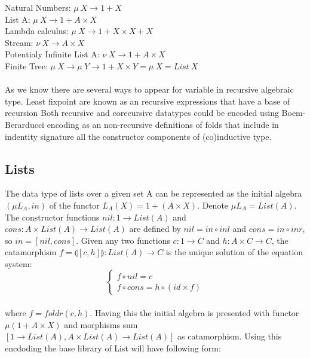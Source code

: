 \documentclass[11pt,oneside]{article}
\begin{document}
\noindent Natural Numbers: $\mu\ X \rightarrow 1 + X$\\
List A: $\mu\ X \rightarrow 1 + A \times X$\\
Lambda calculus: $\mu\ X \rightarrow 1 + X \times X + X$\\
Stream: $\nu\ X \rightarrow A \times X$\\
Potentialy Infinite List A: $\nu\ X \rightarrow 1 + A \times X$\\
Finite Tree: $\mu\ X \rightarrow \mu\ Y \rightarrow 1 + X \times Y = \mu\ X = List\ X$\\

\paragraph{}
As we know there are several ways to appear for variable in recursive algebraic type.
Least fixpoint are known as an recursive expressions that have a base of recursion
Both recursive and corecursive datatypes could be encoded using Boem-Berarducci encoding
as an non-recursive definitions of folds that include in indentity signature all the
constructor components of (co)inductive type.

\subsection{Lists}
The data type of lists over a given set A can be represented as the initial algebra
$(\mu L_A, in)$ of the functor $L_A(X) = 1 + (A \times X)$. Denote $\mu L_A = List(A)$.
The constructor functions $nil: 1 \rightarrow List(A)$ and
$cons: A \times List(A) \rightarrow List(A)$ are defined by
$nil = in \circ inl$ and $cons = in \circ inr$, so $in = [nil,cons]$.
Given any two functions $c: 1 \rightarrow C$ and $h: A \times C \rightarrow C$,
the catamorphism $f = \llparenthesis [c,h] \rrparenthesis : List(A) \rightarrow C$
is the unique solution of the equation system:
\vspace{0.3cm}
$$
\begin{cases}
  f \circ nil  = c \\
  f \circ cons = h \circ (id \times f)
\end{cases}
$$

\paragraph{}
where $f = foldr(c,h)$. Having this the initial algebra is presented with functor
$\mu (1 + A \times X)$ and morphisms sum $[1 \rightarrow List(A), A \times List(A) \rightarrow List(A)]$
as catamorphism. Using this encdoding the base library of List will have following form:
\end{document}
